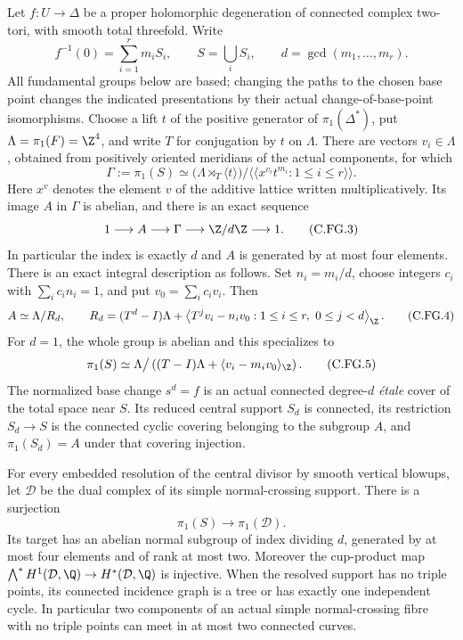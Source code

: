 \begin{proposition}
Let $f:U\to\Delta$ be a proper holomorphic degeneration of connected
complex two-tori, with smooth total threefold. Write
\[
 f^{-1}(0)=\sum_{i=1}^r m_iS_i,\qquad
 S=\bigcup_iS_i,\qquad d=\gcd(m_1,\ldots,m_r).
                                                        \tag{C.FG.1}\label{cdp:eq:C.FG.1}
\]
All fundamental groups below are based; changing the paths to the
chosen base point changes the indicated presentations by their actual
change-of-base-point isomorphisms. Choose a lift $t$ of the positive
generator of $\pi_1(\Delta^*)$, put $\Lambda=\pi_1(F)=\Z^4$, and
write $T$ for conjugation by $t$ on $\Lambda$. There are vectors
$v_i\in\Lambda$, obtained from positively oriented meridians of the
actual components, for which
\[
 \Gamma:=\pi_1(S)
  \simeq
  \bigl(\Lambda\rtimes_T\langle t\rangle\bigr)
       \big/\langle\!\langle x^{v_i}t^{m_i}:1\le i\le r
                    \rangle\!\rangle .                \tag{C.FG.2}\label{cdp:eq:C.FG.2}
\]
Here $x^v$ denotes the element $v$ of the additive lattice written
multiplicatively. Its image $A$ in $\Gamma$ is abelian, and there is
an exact sequence
\[
       1\longrightarrow A\longrightarrow\Gamma
          \longrightarrow\Z/d\Z\longrightarrow1 .    \tag{C.FG.3}\label{cdp:eq:C.FG.3}
\]
In particular the index is exactly $d$ and $A$ is generated by at most
four elements. There is an exact integral description as follows.
Set $n_i=m_i/d$, choose integers $c_i$ with $\sum_i c_in_i=1$, and
put $v_0=\sum_i c_iv_i$. Then
\[
 A\simeq\Lambda/R_d,\qquad
 R_d=(T^d-I)\Lambda+
       \left\langle T^jv_i-n_iv_0:
                         1\le i\le r,\ 0\le j<d\right\rangle_{\Z}.
                                                        \tag{C.FG.4}\label{cdp:eq:C.FG.4}
\]
For $d=1$, the whole group is abelian and this specializes to
\[
 \pi_1(S)\simeq
   \Lambda\big/\left((T-I)\Lambda+
                   \langle v_i-m_iv_0\rangle_{\Z}\right).
                                                        \tag{C.FG.5}\label{cdp:eq:C.FG.5}
\]
The normalized base change $s^d=f$ is an actual connected degree-$d$
\emph{\'etale} cover of the total space near $S$. Its reduced central
support $S_d$ is connected, its restriction $S_d\to S$ is the
connected cyclic covering belonging to the subgroup $A$, and
$\pi_1(S_d)=A$ under that covering injection.

For every embedded resolution of the central divisor by smooth
vertical blowups, let $\mathcal D$ be the dual complex of its simple
normal-crossing support. There is a surjection
\[
                  \pi_1(S)\longrightarrow\pi_1(\mathcal D).
                                                        \tag{C.FG.6}\label{cdp:eq:C.FG.6}
\]
Its target has an abelian normal subgroup of index dividing $d$,
generated by at most four elements and of rank at most two.
Moreover the cup-product map
$\bigwedge^*H^1(\mathcal D,\Q)\to H^*(\mathcal D,\Q)$ is injective.
When the resolved support has
no triple points, its connected incidence graph is a tree or has
exactly one independent cycle. In particular two components of an
actual simple normal-crossing fibre with no triple points can meet
in at most two connected curves.


\end{proposition}
